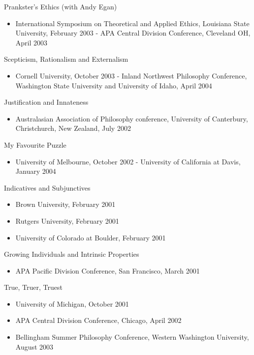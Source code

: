 \documentclass[
  10pt,
  letterpaper,
  DIV=11,
  numbers=noendperiod,
  twoside]{scrartcl}
\providecommand{\tightlist}{%
  \setlength{\itemsep}{0pt}\setlength{\parskip}{0pt}}\usepackage{longtable,booktabs,array}
\begin{document}
Prankster's Ethics (with Andy Egan)

\begin{itemize}
\tightlist
\item
  International Symposium on Theoretical and Applied Ethics, Louisiana
  State University, February 2003 - APA Central Division Conference,
  Cleveland OH, April 2003
\end{itemize}

Scepticism, Rationalism and Externalism

\begin{itemize}
\tightlist
\item
  Cornell University, October 2003 - Inland Northwest Philosophy
  Conference, Washington State University and University of Idaho, April
  2004
\end{itemize}

Justification and Innateness

\begin{itemize}
\tightlist
\item
  Australasian Association of Philosophy conference, University of
  Canterbury, Christchurch, New Zealand, July 2002
\end{itemize}

My Favourite Puzzle

\begin{itemize}
\tightlist
\item
  University of Melbourne, October 2002 - University of California at
  Davis, January 2004
\end{itemize}

Indicatives and Subjunctives

\begin{itemize}
\tightlist
\item
  Brown University, February 2001
\item
  Rutgers University, February 2001
\item
  University of Colorado at Boulder, February 2001
\end{itemize}

Growing Individuals and Intrinsic Properties

\begin{itemize}
\tightlist
\item
  APA Pacific Division Conference, San Francisco, March 2001
\end{itemize}

True, Truer, Truest

\begin{itemize}
\tightlist
\item
  University of Michigan, October 2001
\item
  APA Central Division Conference, Chicago, April 2002
\item
  Bellingham Summer Philosophy Conference, Western Washington
  University, August 2003
\end{itemize}
\end{document}
